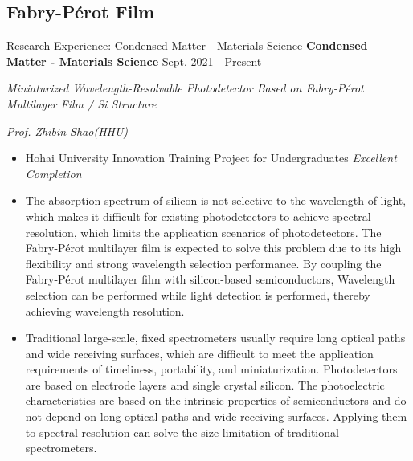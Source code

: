 \documentclass[9pt,aspectratio=169,hyperref=colorlinks]{beamer}
\begin{document}
\subsection{Fabry-P\'{e}rot Film}
\begin{frame}{Research Experience: Condensed Matter - Materials Science}
    \medskip \textbf{Condensed Matter - Materials Science} \hfill Sept. 2021 - Present

    \quad \textit{Miniaturized Wavelength-Resolvable Photodetector Based on Fabry-P\'{e}rot Multilayer Film / Si Structure}

    \hfill \textit{Prof. Zhibin Shao(HHU)}

    \begin{itemize}
        \item Hohai University Innovation Training Project for Undergraduates \textit{Excellent Completion}
        \item The absorption spectrum of silicon is not selective to the wavelength of light, which makes it difficult for existing photodetectors to achieve spectral resolution, which limits the application scenarios of photodetectors. The Fabry-P\'{e}rot multilayer film is expected to solve this problem due to its high flexibility and strong wavelength selection performance. By coupling the Fabry-P\'{e}rot multilayer film with silicon-based semiconductors, Wavelength selection can be performed while light detection is performed, thereby achieving wavelength resolution.
        \item Traditional large-scale, fixed spectrometers usually require long optical paths and wide receiving surfaces, which are difficult to meet the application requirements of timeliness, portability, and miniaturization. Photodetectors are based on electrode layers and single crystal silicon. The photoelectric characteristics are based on the intrinsic properties of semiconductors and do not depend on long optical paths and wide receiving surfaces. Applying them to spectral resolution can solve the size limitation of traditional spectrometers.
    \end{itemize}
\end{frame}
\end{document}

